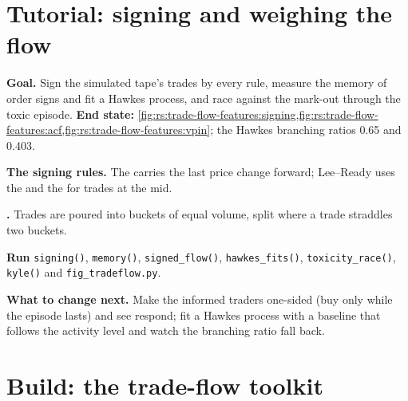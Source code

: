 \section{Tutorial: signing and weighing the flow}\label{tut:rs:trade-flow-features:flow}

\begin{tutorial}
\textbf{Goal.} Sign the simulated tape's trades by every rule, measure the memory of order signs and fit a Hawkes process, and race 
against the mark-out through the toxic episode. \textbf{End state:}
\cref{fig:rs:trade-flow-features:signing,fig:rs:trade-flow-features:acf,fig:rs:trade-flow-features:vpin}; the Hawkes branching ratios 0.65
and 0.403.
\begin{tutsteps}
\item \textbf{The signing rules.} The  carries the last price change forward; Lee--Ready uses the  and the  for
trades at the mid.
\label{lst:rs:trade-flow-features:rules}
\item \textbf{.} Trades are poured into buckets of equal volume, split where a trade straddles two buckets.
\label{lst:rs:trade-flow-features:vpincode}
\item \textbf{Run} \texttt{signing()}, \texttt{memory()}, \texttt{signed\_flow()}, \texttt{hawkes\_fits()}, \texttt{toxicity\_race()}, \texttt{kyle()} and
\texttt{fig\_tradeflow.py}.
\end{tutsteps}
\textbf{What to change next.} Make the informed traders one-sided (buy only while the episode lasts) and see  respond; fit a Hawkes
process with a baseline that follows the activity level and watch the branching ratio fall back.
\end{tutorial}

\section{Build: the trade-flow toolkit}\label{bld:rs:trade-flow-features:tradeflow}

